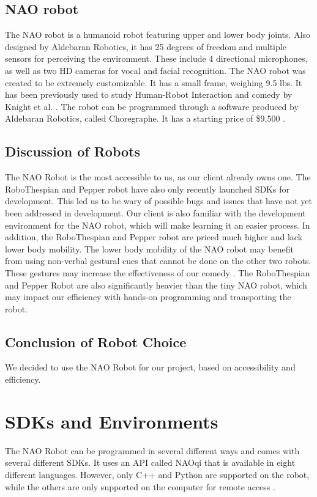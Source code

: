 \subsection{NAO robot}
The NAO robot is a humanoid robot featuring upper and lower body joints.
Also designed by Aldebaran Robotics, it has 25 degrees of freedom and multiple sensors for perceiving the environment.
These include 4 directional microphones, as well as two HD cameras for vocal and facial recognition.
The NAO robot was created to be extremely customizable.
It has a small frame, weighing 9.5 lbs.
It has been previously used to study Human-Robot Interaction and comedy by Knight et al. \cite{KnightSavvy:2011}.
The robot can be programmed through a software produced by Aldebaran Robotics, called Choregraphe.
It has a starting price of \$9,500 \cite{BuyNAO}. \cite{NAORobot}

\subsection{Discussion of Robots}
The NAO Robot is the most accessible to us, as our client already owns one.
The RoboThespian and Pepper robot have also only recently launched SDKs for development.
This led us to be wary of possible bugs and issues that have not yet been addressed in development.
Our client is also familiar with the development environment for the NAO robot, which will make learning it an easier process.
In addition, the RoboThespian and Pepper robot are priced much higher and lack lower body mobility.
The lower body mobility of the NAO robot may benefit from using non-verbal gestural cues that cannot be done on the other two robots.
These gestures may increase the effectiveness of our comedy \cite{KnightEightLessons:2011}.
The RoboThespian and Pepper Robot are also significantly heavier than the tiny NAO robot, which may impact our efficiency with hands-on programming and transporting the robot.

\subsection{Conclusion of Robot Choice}
We decided to use the NAO Robot for our project, based on accessibility and efficiency.

\section{SDKs and Environments}
The NAO Robot can be programmed in several different ways and comes with several different SDKs. It uses an API called NAOqi that is available in eight different languages. However, only C++ and Python are supported on the robot, while the others are only supported on the computer for remote access \cite{NAOSDK:Overview}.

